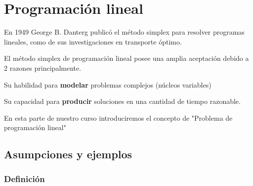 \documentclass[]{article}
\date{}
\begin{document}
\hypertarget{programaciuxf3n-lineal}{%
\section{Programación lineal}\label{programaciuxf3n-lineal}}

En 1949 George B. Danterg publicó el método simplex para resolver
programas lineales, como de sus investigaciones en transporte óptimo.

El método simplex de programación lineal posee una amplia aceptación
debido a 2 razones principalmente.

Su habilidad para \textbf{modelar} problemas complejos (núcleos
variables)

Su capacidad para \textbf{producir} soluciones en una cantidad de tiempo
razonable.

En esta parte de nuestro curso introduciremos el concepto de "Problema
de programación lineal"

\hypertarget{asumpciones-y-ejemplos}{%
\subsection{Asumpciones y ejemplos}\label{asumpciones-y-ejemplos}}

\hypertarget{definiciuxf3n-1}{%
\subsubsection{Definición}\label{definiciuxf3n-1}}
\end{document}

